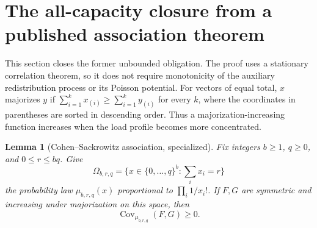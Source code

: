 \documentclass[11pt]{article}
\newtheorem{lemma}{Lemma}
\begin{document}
\section{The all-capacity closure from a published association theorem}
\label{sec:literatureclosure}
This section closes the former unbounded obligation. The proof uses a
stationary correlation theorem, so it does not require monotonicity of
the auxiliary redistribution process or its Poisson potential.
For vectors of equal total, $x$ majorizes $y$ if
$\sum_{i=1}^k x_{(i)}\geq\sum_{i=1}^k y_{(i)}$ for every $k$,
where the coordinates in parentheses are sorted in descending order.
Thus a majorization-increasing function increases when the load profile
becomes more concentrated.

\begin{lemma}[Cohen--Sackrowitz association, specialized]\label{lem:csassociation}
Fix integers $b\geq1$, $q\geq0$, and $0\leq r\leq bq$. Give
\[
 \Omega_{b,r,q}=\{x\in\{0,\ldots,q\}^b:\textstyle\sum_i x_i=r\}
\]
the probability law $\mu_{b,r,q}(x)$ proportional to
$\prod_i1/x_i!$. If $F,G$ are symmetric and increasing under
majorization on this space, then
\[
 \operatorname{Cov}_{\mu_{b,r,q}}(F,G)\geq0.
\]
\end{lemma}
\end{document}
